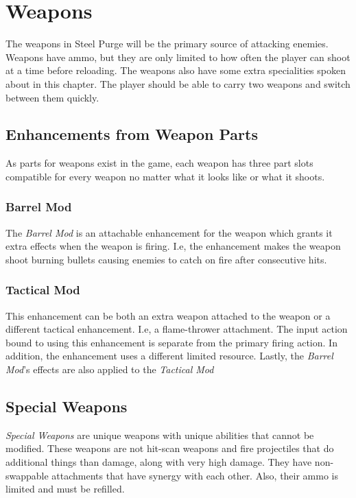 \documentclass[../Main.tex]{subfiles}
\begin{document}
\section{Weapons}

The weapons in Steel Purge will be the primary source of attacking enemies. Weapons have ammo, but they are only limited to how often the player can shoot at a time before reloading. The weapons also have some extra specialities spoken about in this chapter. The player should be able to carry two weapons and switch between them quickly.

\subsection{Enhancements from Weapon Parts}

As parts for weapons exist in the game, each weapon has three part slots compatible for every weapon no matter what it looks like or what it shoots.

\subsubsection{Barrel Mod}

The \emph{Barrel Mod} is an attachable enhancement for the weapon which grants it extra effects when the weapon is firing. I.e, the enhancement makes the weapon shoot burning bullets causing enemies to catch on fire after consecutive hits. 

\subsubsection{Tactical Mod}

This enhancement can be both an extra weapon attached to the weapon or a different tactical enhancement. I.e, a flame-thrower attachment. The input action bound to using this enhancement is separate from the primary firing action. In addition, the enhancement uses a different limited resource. Lastly, the \emph{Barrel Mod}'s effects are also applied to the \emph{Tactical Mod} 

\subsection{Special Weapons}

\emph{Special Weapons} are unique weapons with unique abilities that cannot be modified. These weapons are not hit-scan weapons and fire projectiles that do additional things than damage, along with very high damage. They have non-swappable attachments that have synergy with each other. Also, their ammo is limited and must be refilled. 
\end{document}
